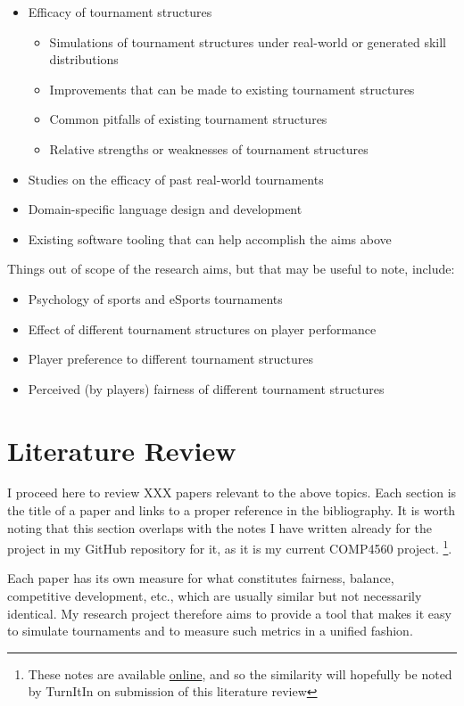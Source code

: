 \documentclass[a4,11pt,twoside,final]{article}
\begin{document}
\begin{itemize}
\item Efficacy of tournament structures
\begin{itemize}
\item Simulations of tournament structures under real-world or generated skill
distributions
\item Improvements that can be made to existing tournament structures
\item Common pitfalls of existing tournament structures
\item Relative strengths or weaknesses of tournament structures
\end{itemize}
\item Studies on the efficacy of past real-world tournaments
\item Domain-specific language design and development
\item Existing software tooling that can help accomplish the aims above
\end{itemize}

Things out of scope of the research aims, but that may be useful to note,
include:
\begin{itemize}
\item Psychology of sports and eSports tournaments
\item Effect of different tournament structures on player performance
\item Player preference to different tournament structures
\item Perceived (by players) fairness of different tournament structures
\end{itemize}


\section{Literature Review}
\label{sec:orgce7efc2}

I proceed here to review XXX papers relevant to the above topics. Each section
is the title of a paper and links to a proper reference in the bibliography. It
is worth noting that this section overlaps with the notes I have written already
for the project in my GitHub repository for it, as it is my current COMP4560
project. \footnote{These notes are available \href{https://github.com/mikeplus64/journeyman/blob/main/docs/background/DSL\%20design.org}{online}, and so the similarity will
hopefully be noted by TurnItIn on submission of this literature review}.

Each paper has its own measure for what constitutes fairness, balance,
competitive development, etc., which are usually similar but not necessarily
identical. My research project therefore aims to provide a tool that makes it
easy to simulate tournaments and to measure such metrics in a unified fashion.
\end{document}
